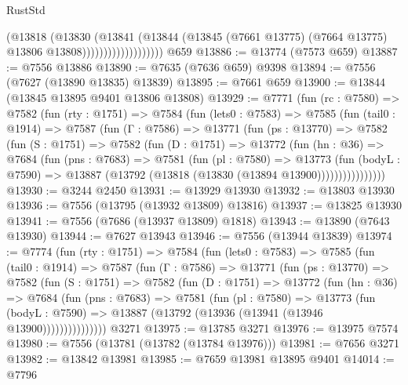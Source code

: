 \begin{lexlean}{RustStd}
\begin{coremodule}
{\begin{coremodule}
{{{{{{{{{{{{{{{{{{{{{{{{{{{{{{{{{{{{{{{{{{{                                (@13818
                                  (@13830
                                    (@13841
                                      (@13844
                                        (@13845
                                          (@7661 @13775)
                                          (@7664 @13775)
                                          @13806
                                          @13808)))))))))))))))))))
    @659
@13886 := @13774 (@7573 @659)
@13887 := @7556 @13886
@13890 := @7635 (@7636 @659) @9398
@13894 := @7556 (@7627 (@13890 @13835) @13839)
@13895 := @7661 @659
@13900 := @13844 (@13845 @13895 @9401 @13806 @13808)
@13929 := @7771
    (fun (rc : @7580) =>
    @7582
      (fun (rty : @1751) =>
      @7584
        (fun (lets0 : @7583) =>
        @7585
          (fun (tail0 : @1914) =>
          @7587
            (fun (Γ : @7586) =>
            @13771
              (fun (ps : @13770) =>
              @7582
                (fun (S : @1751) =>
                @7582
                  (fun (D : @1751) =>
                  @13772
                    (fun (hn : @36) =>
                    @7684
                      (fun (pns : @7683) =>
                      @7581
                        (fun (pl : @7580) =>
                        @13773
                          (fun (bodyL : @7590) =>
                          @13887 (@13792 (@13818 (@13830 (@13894 @13900))))))))))))))))
@13930 := @3244 @2450
@13931 := @13929 @13930
@13932 := @13803 @13930
@13936 := @7556 (@13795 (@13932 @13809) @13816)
@13937 := @13825 @13930
@13941 := @7556 (@7686 (@13937 @13809) @1818)
@13943 := @13890 (@7643 @13930)
@13944 := @7627 @13943
@13946 := @7556 (@13944 @13839)
@13974 := @7774
    (fun (rty : @1751) =>
    @7584
      (fun (lets0 : @7583) =>
      @7585
        (fun (tail0 : @1914) =>
        @7587
          (fun (Γ : @7586) =>
          @13771
            (fun (ps : @13770) =>
            @7582
              (fun (S : @1751) =>
              @7582
                (fun (D : @1751) =>
                @13772
                  (fun (hn : @36) =>
                  @7684
                    (fun (pns : @7683) =>
                    @7581
                      (fun (pl : @7580) =>
                      @13773
                        (fun (bodyL : @7590) =>
                        @13887 (@13792 (@13936 (@13941 (@13946 @13900)))))))))))))))
    @3271
@13975 := @13785 @3271
@13976 := @13975 @7574
@13980 := @7556 (@13781 (@13782 (@13784 @13976)))
@13981 := @7656 @3271
@13982 := @13842 @13981
@13985 := @7659 @13981 @13895 @9401
@14014 := @7796
}}}}}}}}}}}}}}}}}}}}}}}}}}}}}}}}}}}}}}}}}}}
\end{coremodule}}
\end{coremodule}
\end{lexlean}
